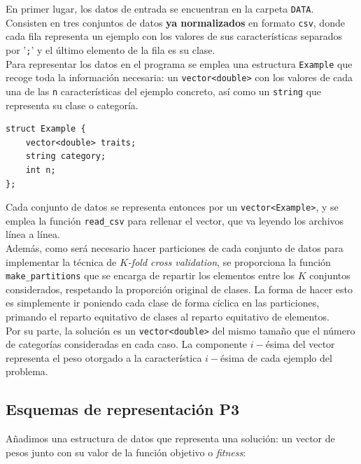 \documentclass[12pt]{article}
\begin{document}
En primer lugar, los datos de entrada se encuentran en la carpeta \verb|DATA|. Consisten en tres conjuntos de datos \textbf{ya normalizados} en formato \verb|csv|, donde cada fila representa un ejemplo con los valores de sus características separados por '\verb|;|' y el último elemento de la fila es su clase.\\

Para representar los datos en el programa se emplea una estructura \verb|Example| que recoge toda la información necesaria: un \verb|vector<double>| con los valores de cada una de las \verb|n| características del ejemplo concreto, así como un \verb|string| que representa su clase o categoría.

\begin{verbatim}
struct Example {
    vector<double> traits;
    string category;
    int n;
};
\end{verbatim}

Cada conjunto de datos se representa entonces por un \verb|vector<Example>|, y se emplea la función \verb|read_csv| para rellenar el vector, que va leyendo los archivos línea a línea.\\

Además, como será necesario hacer particiones de cada conjunto de datos para implementar la técnica de \textit{$K$-fold cross validation}, se proporciona la función \verb|make_partitions| que se encarga de repartir los elementos entre los $K$ conjuntos considerados, respetando la proporción original de clases. La forma de hacer esto es simplemente ir poniendo cada clase de forma cíclica en las particiones, primando el reparto equitativo de clases al reparto equitativo de elementos.\\

Por su parte, la solución es un \verb|vector<double>| del mismo tamaño que el número de categorías consideradas en cada caso. La componente $i-$ésima del vector representa el peso otorgado a la característica $i-$ésima de cada ejemplo del problema.

\subsection*{Esquemas de representación P3}
\label{representacion}

Añadimos una estructura de datos que representa una solución: un vector de pesos junto con su valor de la función objetivo o \textit{fitness}:
\end{document}
